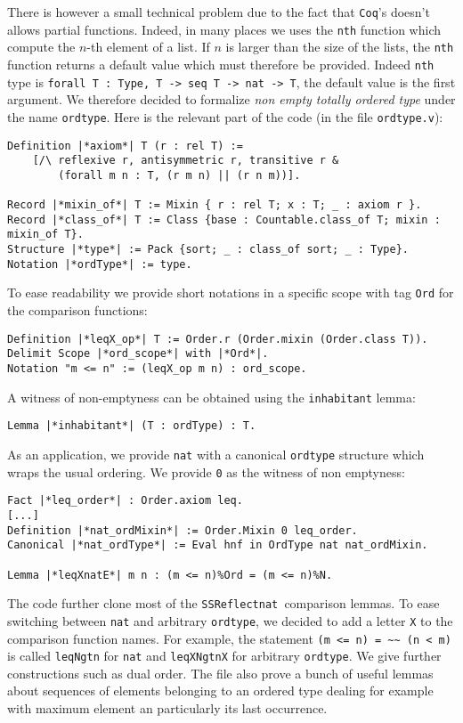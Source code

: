 \documentclass[12pt,a4paper]{article}
\let\verb=\lstinline
\newcommand{\Coq}{\texttt{Coq}\xspace}
\newcommand{\SSR}{\texttt{SSReflect}\xspace}
\begin{document}
There is however a small technical problem due to the fact that \Coq's doesn't
allows partial functions. Indeed, in many places we uses the \verb|nth|
function which compute the $n$-th element of a list. If $n$ is larger than the
size of the lists, the \verb|nth| function returns a default value which
must therefore be provided. Indeed \verb|nth| type is
\verb|forall T : Type, T -> seq T -> nat -> T|,
the default value is the first argument. We therefore decided to formalize
\emph{non empty totally ordered type} under the name \verb|ordtype|. Here
is the relevant part of the code (in the file \verb|ordtype.v|):
\begin{lstlisting}
Definition |*axiom*| T (r : rel T) :=
    [/\ reflexive r, antisymmetric r, transitive r &
        (forall m n : T, (r m n) || (r n m))].

Record |*mixin_of*| T := Mixin { r : rel T; x : T; _ : axiom r }.
Record |*class_of*| T := Class {base : Countable.class_of T; mixin : mixin_of T}.
Structure |*type*| := Pack {sort; _ : class_of sort; _ : Type}.
Notation |*ordType*| := type.
\end{lstlisting}
To ease readability we provide short notations in a specific scope with tag
\verb|Ord| for the comparison functions:
\begin{lstlisting}
Definition |*leqX_op*| T := Order.r (Order.mixin (Order.class T)).
Delimit Scope |*ord_scope*| with |*Ord*|.
Notation "m <= n" := (leqX_op m n) : ord_scope.
\end{lstlisting}
A witness of non-emptyness can be obtained using the \verb+inhabitant+ lemma:
\begin{lstlisting}
Lemma |*inhabitant*| (T : ordType) : T.
\end{lstlisting}
As an application, we provide \verb|nat| with a canonical \verb|ordtype|
structure which wraps the usual ordering. We provide \verb|0| as the witness
of non emptyness:
\begin{lstlisting}
Fact |*leq_order*| : Order.axiom leq.
[...]
Definition |*nat_ordMixin*| := Order.Mixin 0 leq_order.
Canonical |*nat_ordType*| := Eval hnf in OrdType nat nat_ordMixin.

Lemma |*leqXnatE*| m n : (m <= n)%Ord = (m <= n)%N.
\end{lstlisting}
The code further clone most of the \SSR \verb|nat |comparison lemmas. To
ease switching between \verb|nat| and arbitrary \verb|ordtype|, we
decided to add a letter \verb|X| to the comparison function names. For
example, the statement \verb|(m <= n) = ~~ (n < m)| is called
\verb|leqNgtn| for \verb|nat| and \verb|leqXNgtnX| for
arbitrary \verb|ordtype|. We give further constructions such as dual
order. The file also prove a bunch of useful lemmas about sequences of elements
belonging to an ordered type dealing for example with maximum element an
particularly its last occurrence.
\end{document}
